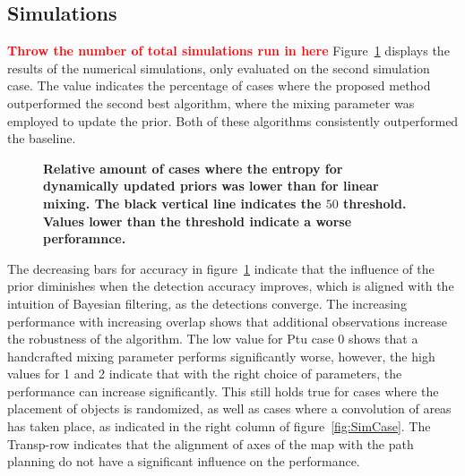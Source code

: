 \documentclass[twocolumn,letterpaper]{IEEEAerospaceCLS}  %
\newcommand\todo[1]{\textbf{\textcolor{red}{#1}}}
\begin{document}
\subsection{Simulations} \label{ssec:ResSim}
\todo{Throw the number of total simulations run in here}
Figure~\ref{fig:Res} displays the results of the numerical simulations, only evaluated on the second simulation case. The value indicates the percentage of cases where the proposed method outperformed the second best algorithm, where the mixing parameter was employed to update the prior. Both of these algorithms consistently outperformed the baseline.  
\begin{figure}
    \centering
    \caption{\bf{
        Relative amount of cases where the entropy for dynamically updated priors was lower than for linear mixing. The black vertical line indicates the $50$ threshold. Values lower than the threshold indicate a worse perforamnce.
    }}
    \label{fig:Res}
\end{figure}
The decreasing bars for accuracy in figure~\ref{fig:Res} indicate that the influence of the prior diminishes when the detection accuracy improves, which is aligned with the intuition of Bayesian filtering, as the detections converge. The increasing performance with increasing overlap shows that additional observations increase the robustness of the algorithm. The low value for Ptu case 0 shows that a handcrafted mixing parameter performs significantly worse, however, the high values for 1 and 2 indicate that with the right choice of parameters, the performance can increase significantly. This still holds true for cases where the placement of objects is randomized, as well as cases where a convolution of areas has taken place, as indicated in the right column of figure~\ref{fig:SimCase}. The Transp-row indicates that the alignment of axes of the map with the path planning do not have a significant influence on the performance.
\end{document}
